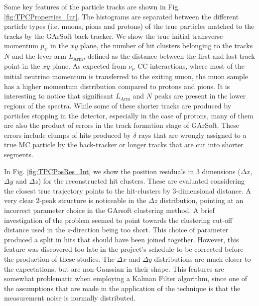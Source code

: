 Some key features of the particle tracks are shown in Fig. \ref{fig:TPCProperties_Int}. The histograms are separated between the different particle types (i.e. muons, pions and protons) of the true particles matched to the tracks by the GArSoft back-tracker. We show the true initial transverse momentum $p_\text{T}$ in the $xy$ plane, the number of hit clusters belonging to the tracks $N$ and the lever arm $L_\textrm{Arm}$, defined as the distance between the first and last track point in the $xy$ plane. As expected from $\nu_\mu$ CC interactions, where most of the initial neutrino momentum is transferred to the exiting muon, the muon sample has a higher momentum distribution compared to protons and pions. It is interesting to notice that significant $L_\text{Arm}$ and $N$ peaks are present in the lower regions of the spectra. While some of these shorter tracks are produced by particles stopping in the detector, especially in the case of protons, many of them are also the product of errors in the track formation stage of GArSoft. These errors include clumps of hits produced by $\delta$ rays that are wrongly assigned to a true MC particle by the back-tracker or longer tracks that are cut into shorter segments.

In Fig. \ref{fig:TPCPosRes_Int} we show the position residuals in 3 dimensions ($\Delta x$, $\Delta y$ and $\Delta z$) for the reconstructed hit clusters. These are evaluated considering the closest true trajectory points to the hit-clusters by 3-dimensional distance. A very clear 2-peak structure is noticeable in the $\Delta z$ distribution, pointing at an incorrect parameter choice in the GArsoft clustering method. A brief investigation of the problem seemed to point towards the clustering cut-off distance used in the $z$-direction being too short. This choice of parameter produced a split in hits that should have been joined together. However, this feature was discovered too late in the project's schedule to be corrected before the production of these studies. The $\Delta x$ and $\Delta y$ distributions are much closer to the expectations, but are  non-Gaussian in their shape. This features are somewhat problematic when employing a Kalman Filter algorithm, since one of the assumptions that are made in the application of the technique is that the measurement noise is normally distributed. 

